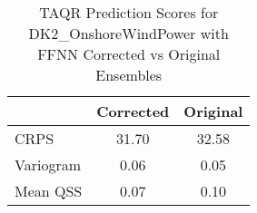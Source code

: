 
    \begin{table}[h!]
    \centering
    \begin{tabular}{|l|c|c|}
    \hline
    \textbf{} & \textbf{Corrected} & \textbf{Original} \\ \hline
    CRPS       & 31.70       & 32.58      \\ \hline
    Variogram  & 0.06  & 0.05 \\ \hline
    Mean QSS   & 0.07        & 0.10       \\ \hline
    \end{tabular}
    \caption{TAQR Prediction Scores for DK2_OnshoreWindPower with FFNN Corrected vs Original Ensembles}
    \label{tab:comparison}
    \end{table}
    